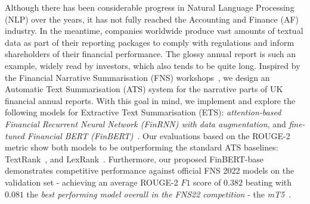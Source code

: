 Although there has been considerable progress in Natural Language Processing (NLP) over the years, it has not fully reached the Accounting and Finance (AF) industry.
In the meantime, companies worldwide produce vast amounts of textual data as part of their reporting packages to comply with regulations and inform shareholders of their financial performance.
The glossy annual report is such an example, widely read by investors, which also tends to be quite long.
Inspired by the Financial Narrative Summarisation (FNS) workshops~\cite{zmandar-etal-2021-financial, fnp-2022-financial},
we design an Automatic Text Summarisation (ATS) system for the narrative parts of UK financial annual reports.
With this goal in mind, we implement and explore the following models for Extractive Text Summarisation (ETS):
\emph{attention-based Financial Recurrent Neural Network (FinRNN) with data augmentation}, and \emph{fine-tuned Financial BERT (FinBERT)}~\cite{yang2020finbert}.
Our evaluations based on the ROUGE-2 metric show both models to be outperforming the standard ATS baselines: TextRank~\cite{mihalcea-tarau-2004-textrank}, and LexRank~\cite{Erkan2004LexRankGC}.
Furthermore, our proposed FinBERT-base demonstrates competitive performance against official FNS 2022 models on the validation set -
achieving an average ROUGE-2 $F1$ score of $0.382$ beating with $0.081$ the \emph{best performing model overall in the FNS22 competition} - the \emph{mT5}~\cite{foroutan-etal-2022-multilingual}.